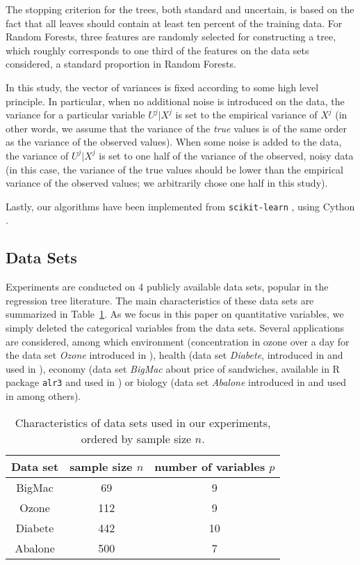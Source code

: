 \documentclass[twoside,11pt]{article}
\begin{document}
The stopping criterion for the trees, both standard and uncertain, is based on the fact that all leaves should contain at least ten percent of the training data. For Random Forests, three features are randomly selected for constructing a tree, which roughly corresponds to one third of the features on the data sets considered, a standard proportion in Random Forests.

In this study, the vector of variances is fixed according to some high level principle. In particular, when no additional noise is introduced on the data, the variance for a particular variable $U^j|X^j$ is set to the empirical variance of $X^j$ (in other words, we assume that the variance of the \textit{true} values is of the same order as the variance of the observed values). When some noise is added to the data, the variance of $U^j|X^j$ is set to one half of the variance of the observed, noisy data (in this case, the variance of the true values should be lower than the empirical variance of the observed values; we arbitrarily chose one half in this study).

Lastly, our algorithms have been implemented from \texttt{scikit-learn} \cite{Scikit-learn}, using Cython \cite{Behnel}.

\subsection{Data Sets} 
\label{sec:data}
Experiments are conducted on 4 publicly available data sets, popular in the regression tree literature.  The main characteristics of these data sets are summarized in Table~\ref{tab:data set-description}.
As we focus in this paper on quantitative variables, we simply deleted the categorical variables from the data sets.
Several applications are considered, among which environment (concentration in ozone over a day for the data set \textit{Ozone} introduced in \cite{cornillon}), health (data set \textit{Diabete}, introduced in \cite{Scikit-learn} and used in \cite{LAR}), economy (data set \textit{BigMac} about price of sandwiches, available in R package \verb?alr3?  and used in \cite{meinshausen2006quantile}) or biology (data set \textit{Abalone} introduced in \cite{Warwick} and used in \cite{meinshausen2006quantile} among others).

\begin{table}[ht!]
  \centering
      \begin{tabular}{ccc}
        \hline
        Data set & sample size $n$ & number of variables $p$ \\
        \hline
        BigMac & 69&9 \\
        Ozone & 112 & 9 \\
        Diabete & 442 & 10 \\
        Abalone & 500 & 7\\
        \hline
      \end{tabular}
\caption{Characteristics of data sets used in our experiments, ordered by sample size $n$.}
\label{tab:data set-description}
\end{table}
    
\end{document}
